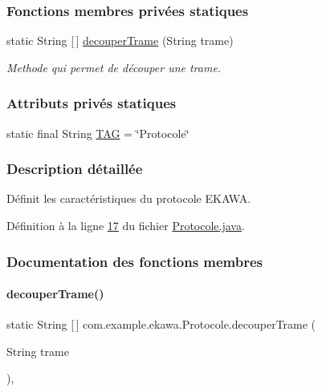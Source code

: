 \subsubsection*{Fonctions membres privées statiques}
\begin{DoxyCompactItemize}
\item 
static String \mbox{[}$\,$\mbox{]} \hyperlink{classcom_1_1example_1_1ekawa_1_1_protocole_a23c261e4ab5ad3c2ac60187f04ae40ea}{decouper\+Trame} (String trame)
\begin{DoxyCompactList}\small\item\em Methode qui permet de découper une trame. \end{DoxyCompactList}\end{DoxyCompactItemize}
\subsubsection*{Attributs privés statiques}
\begin{DoxyCompactItemize}
\item 
static final String \hyperlink{classcom_1_1example_1_1ekawa_1_1_protocole_ae9b68fa0daac528421b887f19413f8f5}{T\+AG} = \char`\"{}Protocole\char`\"{}
\end{DoxyCompactItemize}


\subsubsection{Description détaillée}
Définit les caractéristiques du protocole E\+K\+A\+WA. 

Définition à la ligne \hyperlink{_protocole_8java_source_l00017}{17} du fichier \hyperlink{_protocole_8java_source}{Protocole.\+java}.



\subsubsection{Documentation des fonctions membres}
\mbox{\label{classcom_1_1example_1_1ekawa_1_1_protocole_a23c261e4ab5ad3c2ac60187f04ae40ea}} 
\paragraph{\texorpdfstring{decouper\+Trame()}{decouperTrame()}}
{\footnotesize\ttfamily static String \mbox{[}$\,$\mbox{]} com.\+example.\+ekawa.\+Protocole.\+decouper\+Trame (\begin{DoxyParamCaption}\item[{String}]{trame }\end{DoxyParamCaption})\hspace{0.3cm}{\ttfamily [static]}, {\ttfamily [private]}}



